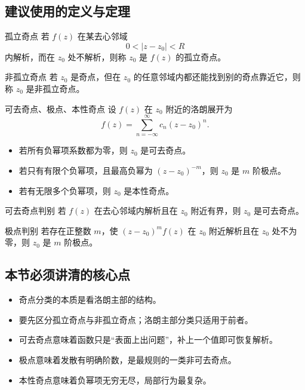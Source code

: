 \subsection*{建议使用的定义与定理}
\begin{dingliyi}{孤立奇点}{}
若 $f(z)$ 在某去心邻域
\[
    0<|z-z_0|<R
\]
内解析，而在 $z_0$ 处不解析，则称 $z_0$ 是 $f(z)$ 的孤立奇点。
\end{dingliyi}

\begin{dingliyi}{非孤立奇点}{}
若 $z_0$ 是奇点，但在 $z_0$ 的任意邻域内都还能找到别的奇点靠近它，则称 $z_0$ 是非孤立奇点。
\end{dingliyi}

\begin{dingliyi}{可去奇点、极点、本性奇点}{}
设 $f(z)$ 在 $z_0$ 附近的洛朗展开为
\[
    f(z)=\sum_{n=-\infty}^{\infty} c_n (z-z_0)^n.
\]
\begin{itemize}
    \item 若所有负幂项系数都为零，则 $z_0$ 是可去奇点。
    \item 若只有有限个负幂项，且最高负幂为 $(z-z_0)^{-m}$，则 $z_0$ 是 $m$ 阶极点。
    \item 若有无限多个负幂项，则 $z_0$ 是本性奇点。
\end{itemize}
\end{dingliyi}

\begin{dingli}{可去奇点判别}{}
若 $f(z)$ 在去心邻域内解析且在 $z_0$ 附近有界，则 $z_0$ 是可去奇点。
\end{dingli}

\begin{dingli}{极点判别}{}
若存在正整数 $m$，使 $(z-z_0)^m f(z)$ 在 $z_0$ 附近解析且在 $z_0$ 处不为零，则 $z_0$ 是 $m$ 阶极点。
\end{dingli}

\subsection*{本节必须讲清的核心点}
\begin{itemize}
    \item 奇点分类的本质是看洛朗主部的结构。
    \item 要先区分孤立奇点与非孤立奇点；洛朗主部分类只适用于前者。
    \item 可去奇点意味着函数只是``表面上出问题''，补上一个值即可恢复解析。
    \item 极点意味着发散有明确阶数，是最规则的一类非可去奇点。
    \item 本性奇点意味着负幂项无穷无尽，局部行为最复杂。
\end{itemize}

